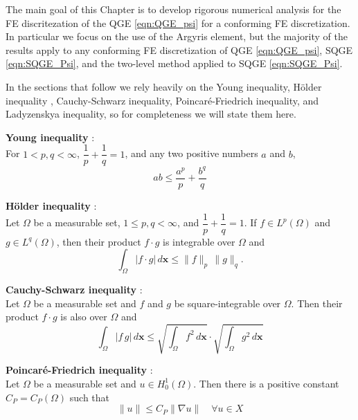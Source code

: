 The main goal of this Chapter is to develop rigorous numerical analysis for
the FE discritezation of the QGE \eqref{eqn:QGE_psi} for a conforming FE
discretization. In particular we focus on the use of the Argyris element, but
the majority of the results apply to any conforming FE discretization of QGE
\eqref{eqn:QGE_psi}, SQGE \eqref{eqn:SQGE_Psi}, and the two-level method applied
to SQGE \eqref{eqn:SQGE_Psi}.

In the sections that follow we rely heavily on the Young inequality, H\"older
inequality , Cauchy-Schwarz inequality, Poincar\'e-Friedrich inequality, and
Ladyzenskya inequality, so for completeness we will state them here.

\begin{definition} \label{def:Young}
  \textbf{Young inequality} \cite{Royden2010}:\\
  For $1 < p,q < \infty$, $\dfrac{1}{p} + \dfrac{1}{q} = 1$, and any two
  positive numbers $a$ and $b$,
  \begin{equation}
    ab \le \frac{a^p}{p} + \frac{b^q}{q}
    \label{eqn:Young}
  \end{equation}
\end{definition}
\begin{definition} \label{def:Holder}
  \textbf{H\"older inequality} \cite{Royden2010}:\\
  Let $\Omega$ be a measurable set, $1\le p,q < \infty$, and $\dfrac{1}{p} +
  \dfrac{1}{q} = 1$. If $f \in L^p(\Omega)$ and $g \in L^q(\Omega)$, then their
  product $f\cdot g$ is integrable over $\Omega$ and
  \begin{equation}
    \int_{\Omega}\! |f\cdot g| \, d\mathbf{x} \le \|f\|_p\, \|g\|_q.
    \label{eqn:Holder}
  \end{equation}
\end{definition}
\begin{definition} \label{def:Cauchy-Schwarz}
  \textbf{Cauchy-Schwarz inequality} \cite{Royden2010}:\\
  Let $\Omega$ be a measurable set and $f$ and $g$ be square-integrable over
  $\Omega$. Then their product $f\cdot g$ is also over $\Omega$ and
  \begin{equation}
    \int_{\Omega}\! |f\,g|\, d\mathbf{x} \le \sqrt{\int_{\Omega}\! f^2 \,
      d\mathbf{x}} \cdot \sqrt{\int_{\Omega}\! g^2 \, d\mathbf{x}}
    \label{eqn:Cauchy}
  \end{equation}

\end{definition}
\begin{definition} \label{def:Poincare}
  \textbf{Poincar\'e-Friedrich inequality} \cite{Layton08}:\\
  Let $\Omega$ be a measurable set and $u \in H^1_0(\Omega)$. Then there is a
  positive constant $C_P = C_P(\Omega)$ such that
  \begin{equation}
    \|u\| \le C_P \|\nabla u\| \quad \forall u \in X
    \label{eqn:Poincare}
  \end{equation}
\end{definition}
